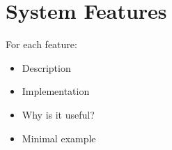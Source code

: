 \section{System Features}

For each feature:
\begin{itemize}
\item{Description}
\item{Implementation}
\item{Why is it useful?}
\item{Minimal example}
\end{itemize}
